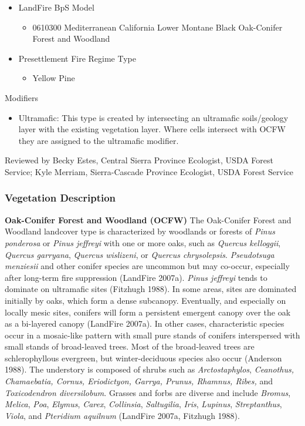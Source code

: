 \begin{itemize}
\begin{itemize}
		\item LandFire BpS Model
		\begin{itemize}
			\item 0610300 Mediterranean California Lower Montane Black Oak-Conifer Forest and Woodland
		\end{itemize}
		
		\item Presettlement Fire Regime Type
		\begin{itemize}
			\item Yellow Pine
		\end{itemize}
\end{itemize}
\end{itemize}

Modifiers
\begin{itemize}
	\item Ultramafic: This type is created by intersecting an ultramafic soils/geology layer with the existing vegetation layer. Where cells intersect with OCFW they are assigned to the ultramafic modifier.
\end{itemize}

\noindent Reviewed by Becky Estes, Central Sierra Province Ecologist, USDA Forest Service; Kyle Merriam, Sierra-Cascade Province Ecologist, USDA Forest Service


\subsubsection{Vegetation Description}
\textbf{Oak-Conifer Forest and Woodland (OCFW)} The Oak-Conifer Forest and Woodland landcover type is characterized by woodlands or forests of \emph{Pinus ponderosa} or \emph{Pinus jeffreyi} with one or more oaks, such as \emph{Quercus kelloggii}, \emph{Quercus garryana}, \emph{Quercus wislizeni}, or \emph{Quercus chrysolepsis}. \emph{Pseudotsuga menziesii} and other conifer species are uncommon but may co-occur, especially after long-term fire suppression (LandFire 2007a). \emph{Pinus jeffreyi} tends to dominate on ultramafic sites (Fitzhugh 1988). In some areas, sites are dominated initially by oaks, which form a dense subcanopy. Eventually, and especially on locally mesic sites, conifers will form a persistent emergent canopy over the oak as a bi-layered canopy (LandFire 2007a). In other cases, characteristic species occur in a mosaic-like pattern with small pure stands of conifers interspersed with small stands of broad-leaved trees. Most of the broad-leaved trees are schlerophyllous evergreen, but winter-deciduous species also occur (Anderson 1988). The understory is composed of shrubs such as \emph{Arctostaphylos}, \emph{Ceanothus, Chamaebatia, Cornus, Eriodictyon, Garrya, Prunus, Rhamnus, Ribes,} and \emph{Toxicodendron diversilobum}. Grasses and forbs are diverse and include \emph{Bromus}, \emph{Melica}, \emph{Poa}, \emph{Elymus}, \emph{Carex}, \emph{Collinsia}, \emph{Saltugilia}, \emph{Iris}, \emph{Lupinus}, \emph{Streptanthus}, \emph{Viola}, and \emph{Pteridium aquilnum} (LandFire 2007a, Fitzhugh 1988).

